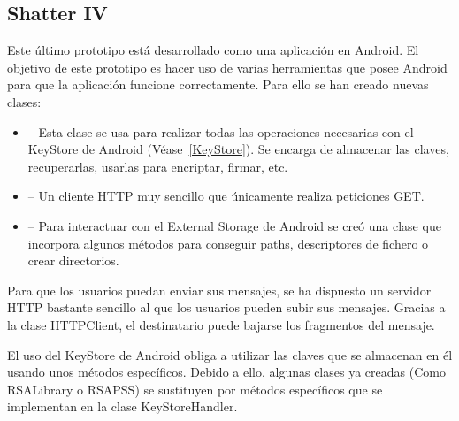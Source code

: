 \subsection{Shatter IV}


Este último prototipo está desarrollado como una aplicación en Android. El
objetivo de este prototipo es hacer uso de varias herramientas que posee Android
para que la aplicación funcione correctamente. Para ello se han creado nuevas
clases:

\begin{itemize}
  \item {} -- Esta clase se usa para realizar todas las
  operaciones necesarias con el KeyStore de Android (Véase~\ref{KeyStore}). Se
  encarga de almacenar las claves, recuperarlas, usarlas para encriptar,
  firmar, etc.

  \item {} -- Un cliente HTTP muy sencillo que únicamente
  realiza peticiones GET.

  \item {} -- Para interactuar con el External Storage de
  Android se creó una clase que incorpora algunos métodos para conseguir paths,
  descriptores de fichero o crear directorios.
\end{itemize}


Para que los usuarios puedan enviar sus mensajes, se ha dispuesto un servidor
HTTP bastante sencillo al que los usuarios pueden subir sus mensajes. Gracias a
la clase HTTPClient, el destinatario puede bajarse los fragmentos del mensaje.


El uso del KeyStore de Android obliga a utilizar las claves que se almacenan en
él usando unos métodos específicos. Debido a ello, algunas clases ya creadas
(Como RSALibrary o RSAPSS) se sustituyen por métodos específicos que se
implementan en la clase KeyStoreHandler.

